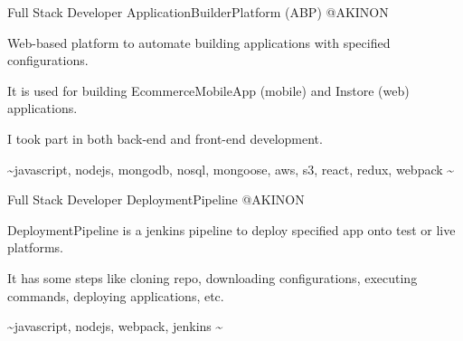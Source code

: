 

\begin{cventries}

  \cventry
    {Full Stack Developer} %
    {ApplicationBuilderPlatform (ABP)} %
    {@AKINON} %
    {}
    {
      \begin{cvitems} %
        \item {Web-based platform to automate building applications with specified configurations.}
        \item {It is used for building EcommerceMobileApp (mobile) and Instore (web) applications.}
        \item {I took part in both back-end and front-end development.}
        \item {\textasciitilde javascript, nodejs, mongodb, nosql, mongoose, aws, s3, react, redux, webpack \textasciitilde}
      \end{cvitems}
    }

  \cventry
    {Full Stack Developer} %
    {DeploymentPipeline} %
    {@AKINON} %
    {}
    {
      \begin{cvitems} %
        \item {DeploymentPipeline is a jenkins pipeline to deploy specified app onto test or live platforms.}
        \item {It has some steps like cloning repo, downloading configurations, executing commands, deploying applications, etc.}
        \item {\textasciitilde javascript, nodejs, webpack, jenkins \textasciitilde}
      \end{cvitems}
    }


\end{cventries}
